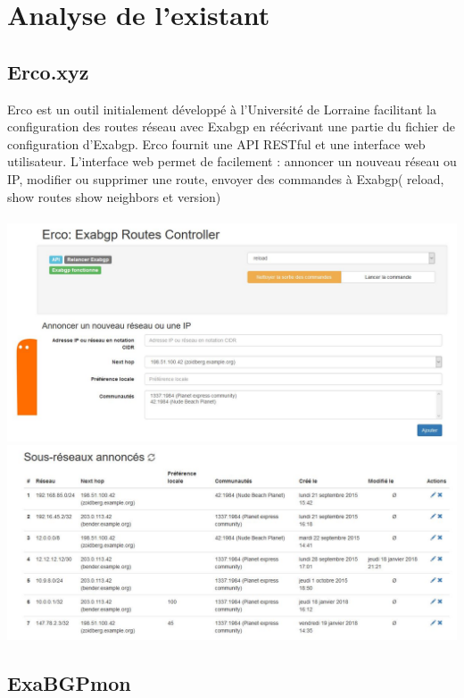 \section{Analyse de l'existant}
 \subsection{Erco.xyz \cite{Erco}}


Erco est un outil initialement développé à l'Université de Lorraine facilitant la configuration  des routes réseau avec Exabgp en réécrivant une partie du fichier de configuration d'Exabgp. Erco fournit une API RESTful et une interface web utilisateur. L'interface web permet de facilement : annoncer un nouveau réseau ou IP, modifier ou supprimer une route, envoyer des commandes à Exabgp( reload, show routes show neighbors et version)
\\
\\
\includegraphics[scale = 0.5]{img/erco1.JPG}
\includegraphics[scale = 0.5]{img/erco2.JPG}

\subsection{ExaBGPmon}

